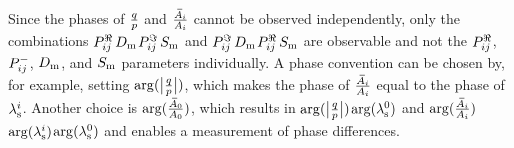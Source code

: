 Since the phases of $\qp$ and $\frac{\Abari}{\Ai}$ cannot be observed independently, only the combinations $\Pre\,\Dm$\textplus$\Pim\,\Sm$
and $\Pim\,\Dm$\textminus$\Pre\,\Sm$ are observable and not the $\Pre$, $\Pmn$, $\Dm$, and $\Sm$ parameters individually. A phase
convention can be chosen by, for example, setting $\arg(\qpAbsAlt)$, which makes the phase of $\frac{\Abari}{\Ai}$ equal
to the phase of $\lamsi$. Another choice is $\arg(\frac{\Abari[\text{0}]}{\Ai[\text{0}]})$,
which results in $\arg(\qpAbsAlt)$\texteq$\arg(\lamsi[\text{0}])$ and
$\arg(\frac{\Abari}{\Ai})$\texteq$\arg(\lamsi)$\textminus$\arg(\lamsi[\text{0}])$ and enables a measurement of phase differences.
